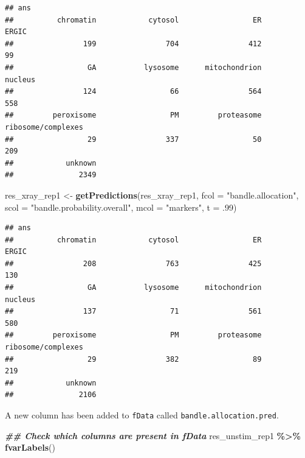 \documentclass[9pt,a4paper,]{extarticle}
\newenvironment{Shaded}{\begin{snugshade}}{\end{snugshade}}
\newcommand{\AttributeTok}[1]{\textcolor[rgb]{0.13,0.29,0.53}{#1}}
\newcommand{\DecValTok}[1]{\textcolor[rgb]{0.00,0.00,0.81}{#1}}
\newcommand{\DocumentationTok}[1]{\textcolor[rgb]{0.56,0.35,0.01}{\textbf{\textit{#1}}}}
\newcommand{\FunctionTok}[1]{\textcolor[rgb]{0.13,0.29,0.53}{\textbf{#1}}}
\newcommand{\NormalTok}[1]{#1}
\newcommand{\OtherTok}[1]{\textcolor[rgb]{0.56,0.35,0.01}{#1}}
\newcommand{\SpecialCharTok}[1]{\textcolor[rgb]{0.81,0.36,0.00}{\textbf{#1}}}
\newcommand{\StringTok}[1]{\textcolor[rgb]{0.31,0.60,0.02}{#1}}
\begin{document}
\begin{verbatim}
## ans
##          chromatin            cytosol                 ER              ERGIC 
##                199                704                412                 99 
##                 GA           lysosome      mitochondrion            nucleus 
##                124                 66                564                558 
##         peroxisome                 PM         proteasome ribosome/complexes 
##                 29                337                 50                209 
##            unknown 
##               2349
\end{verbatim}

\begin{Shaded}
\begin{Highlighting}[]
\NormalTok{res\_xray\_rep1 }\OtherTok{\textless{}{-}} \FunctionTok{getPredictions}\NormalTok{(res\_xray\_rep1,}
                                \AttributeTok{fcol =} \StringTok{"bandle.allocation"}\NormalTok{,  }
                                \AttributeTok{scol =} \StringTok{"bandle.probability.overall"}\NormalTok{,    }
                                \AttributeTok{mcol =} \StringTok{"markers"}\NormalTok{, }
                                \AttributeTok{t =}\NormalTok{ .}\DecValTok{99}\NormalTok{)}
\end{Highlighting}
\end{Shaded}

\begin{verbatim}
## ans
##          chromatin            cytosol                 ER              ERGIC 
##                208                763                425                130 
##                 GA           lysosome      mitochondrion            nucleus 
##                137                 71                561                580 
##         peroxisome                 PM         proteasome ribosome/complexes 
##                 29                382                 89                219 
##            unknown 
##               2106
\end{verbatim}

A new column has been added to \texttt{fData} called \texttt{bandle.allocation.pred}.

\begin{Shaded}
\begin{Highlighting}[]
\DocumentationTok{\#\# Check which columns are present in fData}
\NormalTok{res\_unstim\_rep1 }\SpecialCharTok{\%\textgreater{}\%} 
  \FunctionTok{fvarLabels}\NormalTok{()}
\end{Highlighting}
\end{Shaded}
\end{document}
